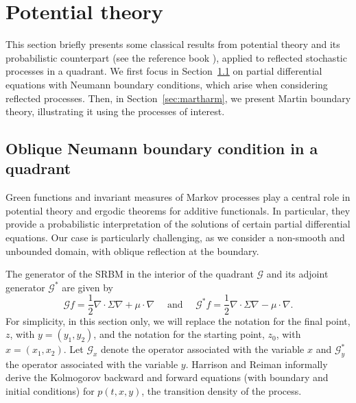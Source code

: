 \documentclass[11pt]{article}
\theoremstyle{definition}
\renewcommand{\geq}{\geqslant}
\begin{document}
\section{Potential theory}
\label{s1.3}

This section briefly presents some classical results from potential theory and its probabilistic counterpart (see the reference book \cite{Doob2001}), applied to reflected stochastic processes in a quadrant. We first focus in Section~\ref{sec:neumann} on partial differential equations with Neumann boundary conditions, which arise when considering reflected processes. Then, in Section~\ref{sec:martharm}, we present Martin boundary theory, illustrating it using the processes of interest.

\subsection{Oblique Neumann boundary condition in a quadrant}
\label{sec:neumann}

Green functions and invariant measures of Markov processes play a central role in potential theory and ergodic theorems for additive functionals. In particular, they provide a probabilistic interpretation of the solutions of certain partial differential equations. Our case is particularly challenging, as we consider a non-smooth and unbounded domain, with oblique reflection at the boundary.

The generator of the SRBM in the interior of the quadrant $\mathcal{G}$ and its adjoint generator $\mathcal{G}^*$ are given by
$$
\mathcal{G} f=\frac{1}{2} \nabla \cdot \Sigma \nabla+\mu \cdot \nabla \quad \text { and } \quad \mathcal{G}^* f=\frac{1}{2} \nabla \cdot \Sigma \nabla-\mu \cdot \nabla .
$$
For simplicity, in this section only, we will replace the notation for the final point, $z$, with $y=(y_1,y_2)$, and the notation for the starting point, $z_0$, with $x=(x_1,x_2)$. Let $\mathcal{G}_x$ denote the operator associated with the variable $x$ and $\mathcal{G}^*_y$ the operator associated with the variable $y$. Harrison and Reiman \cite[(8.2) and (8.3)]{HaRe-81} informally derive the Kolmogorov backward and forward equations (with boundary and initial conditions) for $p(t,x, y)$, the transition density of the process.
\end{document}
